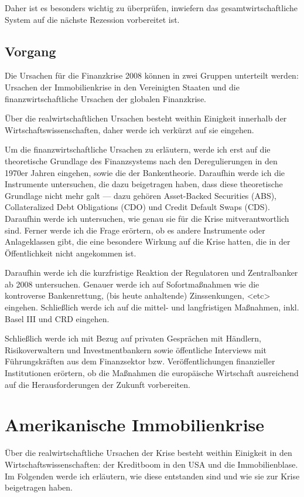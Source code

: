 \documentclass[a4paper,draft,11pt]{report}
\begin{document}
Daher ist es besonders wichtig zu
überprüfen, inwiefern das gesamtwirtschaftliche System auf die nächste Rezession vorbereitet ist.
\section{Vorgang}
Die Ursachen für die Finanzkrise 2008 können 
in zwei Gruppen unterteilt werden: Ursachen der Immobilienkrise
in den Vereinigten Staaten und die finanzwirtschaftliche
Ursachen der globalen Finanzkrise.

\"Uber die realwirtschaftlichen Ursachen besteht weithin
Einigkeit innerhalb der Wirtschaftswissenschaften, daher
werde ich verk\"urzt auf sie eingehen.

Um die finanzwirtschaftliche Ursachen zu erläutern, werde
ich erst auf die theoretische Grundlage des Finanzsystems
nach den Deregulierungen in den 1970er Jahren eingehen,
sowie die der Bankentheorie. Daraufhin werde ich die 
Instrumente untersuchen, die dazu beigetragen haben,
dass diese theoretische Grundlage nicht mehr galt --- 
dazu geh\"oren Asset-Backed Securities (ABS),
Collateralized Debt Obligations (CDO) und
Credit Default Swaps (CDS). Daraufhin werde
ich untersuchen, wie genau sie für die
Krise mitverantwortlich sind. Ferner werde ich
die Frage erörtern, ob es andere Instrumente
oder Anlageklassen gibt, die eine
besondere Wirkung auf die Krise hatten, die in
der Öffentlichkeit nicht angekommen ist.

Daraufhin werde ich die kurzfristige Reaktion
der Regulatoren und Zentralbanker ab 2008
untersuchen. Genauer werde ich auf
Sofortmaßnahmen wie die kontroverse
Bankenrettung, (bis heute anhaltende)
Zinssenkungen, <etc> eingehen.
Schließlich werde ich auf die mittel- und
langfristigen Maßnahmen, inkl. Basel
III und CRD eingehen.

Schließlich werde ich mit Bezug auf
privaten Gesprächen mit Händlern,
Risikoverwaltern und Investmentbankern 
sowie \"offentliche Interviews mit F\"uhrungskr\"aften
aus dem Finanzsektor bzw.
Ver\"offentlichungen finanzieller Institutionen
erörtern, ob die Maßnahmen die europäische
Wirtschaft ausreichend auf die
Herausforderungen der Zukunft vorbereiten.

\chapter{Amerikanische Immobilienkrise}
Über die realwirtschaftliche Ursachen der Krise besteht
weithin Einigkeit in den Wirtschaftswissenschaften: 
der Kreditboom in den USA und die Immobilienblase.
Im Folgenden werde ich erläutern, wie diese entstanden
sind und wie sie zur Krise beigetragen haben.
\end{document}
